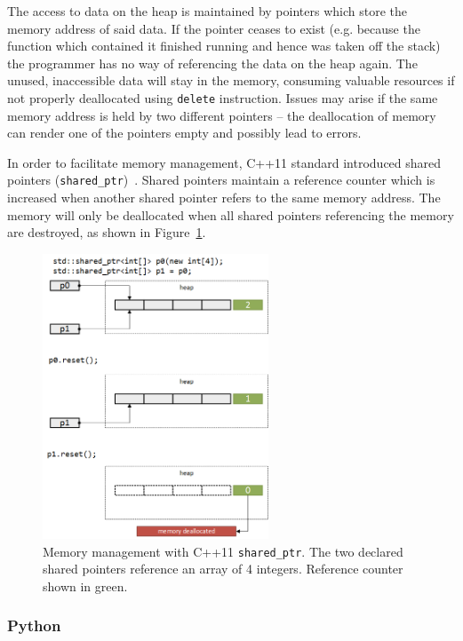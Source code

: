 The access to data on the heap is maintained by pointers which store the memory address of 
said data. If the pointer ceases to exist (e.g. because the function which contained it 
finished running and hence was taken off the stack) the programmer has no way of referencing 
the data on the heap again. The unused, inaccessible data will stay in the memory, consuming 
valuable resources if not properly deallocated using \texttt{delete} instruction. Issues may 
arise if the same memory address is held by two different pointers -- the deallocation of 
memory can render one of the pointers empty and possibly lead to errors.

In order to facilitate memory management, C++11 standard introduced shared pointers 
(\texttt{shared\_ptr})~\cite{C++SharedPtr}. Shared pointers maintain a reference counter 
which is increased when another shared pointer refers to the same memory address. The memory 
will only be deallocated when all shared pointers referencing the memory are destroyed, as shown 
in Figure~\ref{fig:shared_ptr}.

\begin{figure}[h!]
    \centering
    \includegraphics[width=0.6\textwidth]{img/shared_ptr}
    \caption{Memory management with C++11 \texttt{shared\_ptr}. The two declared shared pointers 
    reference an array of 4 integers. Reference counter shown in green.}
    \label{fig:shared_ptr}
\end{figure}

\subsubsection{Python}

